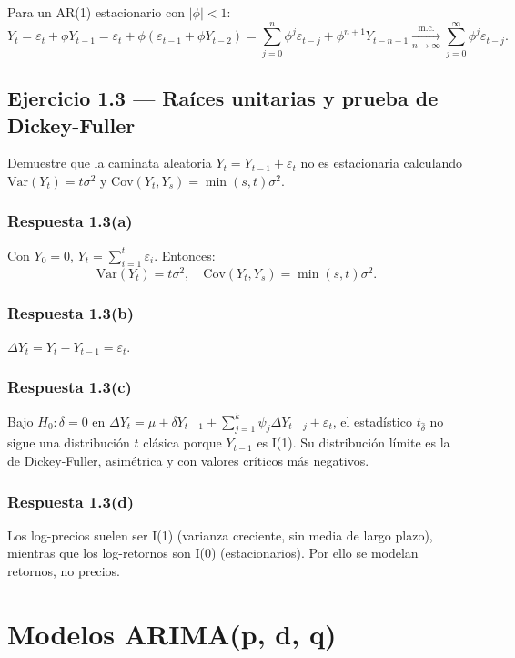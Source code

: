 \documentclass[12pt, letterpaper]{article}
\begin{document}
Para un AR(1) estacionario con $|\phi|<1$:
\[
Y_t = \varepsilon_t + \phi Y_{t-1} = \varepsilon_t + \phi(\varepsilon_{t-1}+\phi Y_{t-2}) = \sum_{j=0}^{n} \phi^j \varepsilon_{t-j} + \phi^{n+1}Y_{t-n-1} \xrightarrow[n\to\infty]{\text{m.c.}} \sum_{j=0}^{\infty} \phi^j \varepsilon_{t-j}.
\]

\subsection{Ejercicio 1.3 — Raíces unitarias y prueba de Dickey-Fuller}

Demuestre que la caminata aleatoria $Y_t = Y_{t-1} + \varepsilon_t$ no es estacionaria calculando $\text{Var}(Y_t)=t\sigma^2$ y $\text{Cov}(Y_t, Y_s)=\min(s,t)\sigma^2$.

\subsubsection*{Respuesta 1.3(a)}

Con $Y_0=0$, $Y_t = \sum_{i=1}^t \varepsilon_i$. Entonces:
\[
\text{Var}(Y_t) = t\sigma^2, \quad \text{Cov}(Y_t, Y_s) = \min(s,t)\sigma^2.
\]

\subsubsection*{Respuesta 1.3(b)}

$\Delta Y_t = Y_t - Y_{t-1} = \varepsilon_t$.

\subsubsection*{Respuesta 1.3(c)}

Bajo $H_0: \delta=0$ en $\Delta Y_t = \mu + \delta Y_{t-1} + \sum_{j=1}^k \psi_j \Delta Y_{t-j} + \varepsilon_t$, el estadístico $t_{\hat{\delta}}$ no sigue una distribución $t$ clásica porque $Y_{t-1}$ es I(1). Su distribución límite es la de Dickey-Fuller, asimétrica y con valores críticos más negativos.

\subsubsection*{Respuesta 1.3(d)}

Los log-precios suelen ser I(1) (varianza creciente, sin media de largo plazo), mientras que los log-retornos son I(0) (estacionarios). Por ello se modelan retornos, no precios.

\newpage
\section{Modelos ARIMA(p, d, q)}
\end{document}
